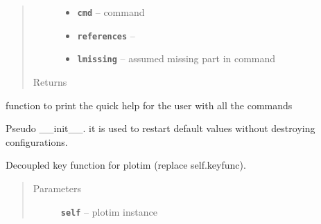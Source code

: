 \documentclass[letterpaper,10pt,english]{sphinxmanual}
\begin{document}
\begin{fulllineitems}
\begin{fulllineitems}
\begin{quote}
\begin{description}
\begin{itemize}
\item {} 
\textbf{\texttt{cmd}} -- command

\item {} 
\textbf{\texttt{references}} -- 

\item {} 
\textbf{\texttt{lmissing}} -- assumed missing part in command

\end{itemize}

\item[{Returns}] \leavevmode


\end{description}\end{quote}

\end{fulllineitems}


\begin{fulllineitems}
\label{RRtoolbox.lib:RRtoolbox.lib.plotter.plotim.help}
function to print the quick help for the user with all the commands

\end{fulllineitems}


\begin{fulllineitems}
\label{RRtoolbox.lib:RRtoolbox.lib.plotter.plotim.init}
Pseudo \_\_init\_\_. it is used to restart default
values without destroying configurations.

\end{fulllineitems}


\begin{fulllineitems}
\label{RRtoolbox.lib:RRtoolbox.lib.plotter.plotim.keyfunc}
Decoupled key function for plotim (replace self.keyfunc).
\begin{quote}\begin{description}
\item[{Parameters}] \leavevmode
\textbf{\texttt{self}} -- plotim instance

\end{description}\end{quote}


\end{fulllineitems}
\end{fulllineitems}
\end{document}
